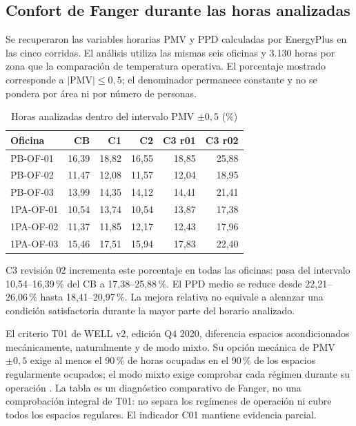 \subsection{Confort de Fanger durante las horas analizadas}
\label{sec:confort-fanger-comparado}
Se recuperaron las variables horarias PMV y PPD calculadas por EnergyPlus en las cinco corridas. El análisis utiliza las mismas seis oficinas y 3.130 horas por zona que la comparación de temperatura operativa. El porcentaje mostrado corresponde a $|\mathrm{PMV}|\leq0,5$; el denominador permanece constante y no se pondera por área ni por número de personas.
\begin{table}[htbp]\centering
\caption{Horas analizadas dentro del intervalo PMV $\pm0,5$ (\%)}
{\small\singlespacing\renewcommand{\arraystretch}{1.2}
\begin{tabular}{lrrrrr}\toprule
Oficina & CB & C1 & C2 & C3 r01 & C3 r02 \\ \midrule
PB-OF-01 & 16,39 & 18,82 & 16,55 & 18,85 & 25,88 \\
PB-OF-02 & 11,47 & 12,08 & 11,57 & 12,04 & 18,95 \\
PB-OF-03 & 13,99 & 14,35 & 14,12 & 14,41 & 21,41 \\
1PA-OF-01 & 10,54 & 13,74 & 10,54 & 13,87 & 17,38 \\
1PA-OF-02 & 11,37 & 11,85 & 12,17 & 12,43 & 17,96 \\
1PA-OF-03 & 15,46 & 17,51 & 15,94 & 17,83 & 22,40 \\
\bottomrule\end{tabular}}
\end{table}
C3 revisión 02 incrementa este porcentaje en todas las oficinas: pasa del intervalo 10,54--16,39\,\% del CB a 17,38--25,88\,\%. El PPD medio se reduce desde 22,21--26,06\,\% hasta 18,41--20,97\,\%. La mejora relativa no equivale a alcanzar una condición satisfactoria durante la mayor parte del horario analizado.

El criterio T01 de WELL v2, edición Q4 2020, diferencia espacios acondicionados mecánicamente, naturalmente y de modo mixto. Su opción mecánica de PMV $\pm0,5$ exige al menos el 90\,\% de horas ocupadas en el 90\,\% de los espacios regularmente ocupados; el modo mixto exige comprobar cada régimen durante su operación \parencite{iwbiWellV22020}. La tabla es un diagnóstico comparativo de Fanger, no una comprobación integral de T01: no separa los regímenes de operación ni cubre todos los espacios regulares. El indicador C01 mantiene evidencia parcial.
